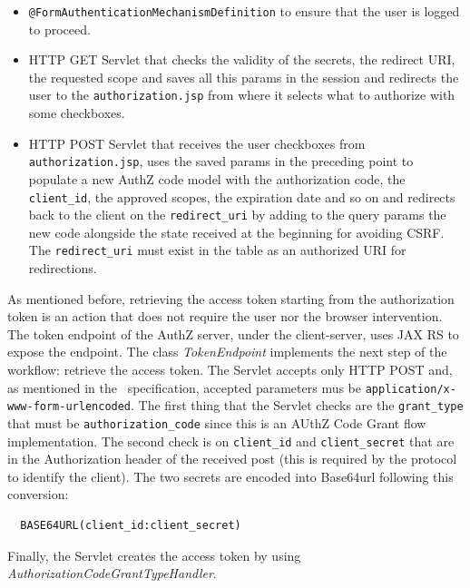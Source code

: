 \begin{itemize}
    \item \texttt{@FormAuthenticationMechanismDefinition} to ensure that the user is logged to proceed.
    \item HTTP GET Servlet that checks the validity of the secrets, the redirect URI, the requested scope and saves all this params in the session and redirects the user to the \texttt{authorization.jsp} from where it selects what to authorize with some checkboxes.
    \item HTTP POST Servlet that receives the user checkboxes from \texttt{authorization.jsp}, uses the saved params in the preceding point to populate a new AuthZ code model with the authorization code, the \texttt{client\_id}, the approved scopes, the expiration date and so on and redirects back to the client on the \texttt{redirect\_uri} by adding to the query params the new code alongside the state received at the beginning for avoiding CSRF. The \texttt{redirect\_uri} must exist in the table as an authorized URI for redirections.
\end{itemize}

\noindent As mentioned before, retrieving the access token starting from the authorization token is an action that does not require the user nor the browser intervention. The token endpoint of the AuthZ server, under the client-server, uses JAX RS to expose the endpoint. The class \textit{TokenEndpoint} implements the next step of the workflow: retrieve the access token. The Servlet accepts only HTTP POST and, as mentioned in the \oauth\ specification, accepted parameters mus be \texttt{application/x-www-form-urlencoded}. The first thing that the Servlet checks are the \texttt{grant\_type} that must be \texttt{authorization\_code} since this is an AUthZ Code Grant flow implementation. The second check is on \texttt{client\_id} and \texttt{client\_secret} that are in the Authorization header of the received post (this is required by the protocol to identify the client). The two secrets are encoded into Base64url following this conversion:
\begin{lstlisting}
  BASE64URL(client_id:client_secret)
\end{lstlisting}

\noindent Finally, the Servlet creates the access token by using \textit{AuthorizationCodeGrantTypeHandler}. 

